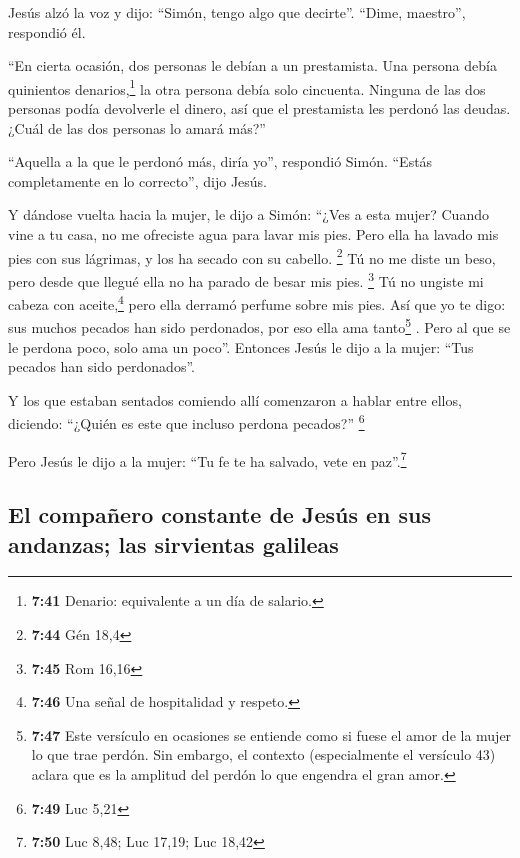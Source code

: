  Jesús alzó la voz y dijo: ``Simón, tengo algo que
decirte''. ``Dime, maestro'', respondió él.

 ``En cierta ocasión, dos personas le debían a un
prestamista. Una persona debía quinientos denarios,\footnote{\textbf{7:41}
  Denario: equivalente a un día de salario.} la otra persona debía solo
cincuenta.  Ninguna de las dos personas podía devolverle
el dinero, así que el prestamista les perdonó las deudas. ¿Cuál de las
dos personas lo amará más?''

 ``Aquella a la que le perdonó más, diría yo'', respondió
Simón. ``Estás completamente en lo correcto'', dijo Jesús.

 Y dándose vuelta hacia la mujer, le dijo a Simón: ``¿Ves
a esta mujer? Cuando vine a tu casa, no me ofreciste agua para lavar mis
pies. Pero ella ha lavado mis pies con sus lágrimas, y los ha secado con
su cabello. \footnote{\textbf{7:44} Gén 18,4}  Tú no me
diste un beso, pero desde que llegué ella no ha parado de besar mis
pies. \footnote{\textbf{7:45} Rom 16,16}  Tú no ungiste
mi cabeza con aceite,\footnote{\textbf{7:46} Una señal de hospitalidad y
  respeto.} pero ella derramó perfume sobre mis pies. 
Así que yo te digo: sus muchos pecados han sido perdonados, por eso ella
ama tanto\footnote{\textbf{7:47} Este versículo en ocasiones se entiende
  como si fuese el amor de la mujer lo que trae perdón. Sin embargo, el
  contexto (especialmente el versículo 43) aclara que es la amplitud del
  perdón lo que engendra el gran amor.} . Pero al que se le perdona
poco, solo ama un poco''.  Entonces Jesús le dijo a la
mujer: ``Tus pecados han sido perdonados''.

 Y los que estaban sentados comiendo allí comenzaron a
hablar entre ellos, diciendo: ``¿Quién es este que incluso perdona
pecados?'' \footnote{\textbf{7:49} Luc 5,21}

 Pero Jesús le dijo a la mujer: ``Tu fe te ha salvado,
vete en paz''.\footnote{\textbf{7:50} Luc 8,48; Luc 17,19; Luc 18,42}

\hypertarget{el-compauxf1ero-constante-de-jesuxfas-en-sus-andanzas-las-sirvientas-galileas}{%
\subsection{El compañero constante de Jesús en sus andanzas; las
sirvientas
galileas}\label{el-compauxf1ero-constante-de-jesuxfas-en-sus-andanzas-las-sirvientas-galileas}}

